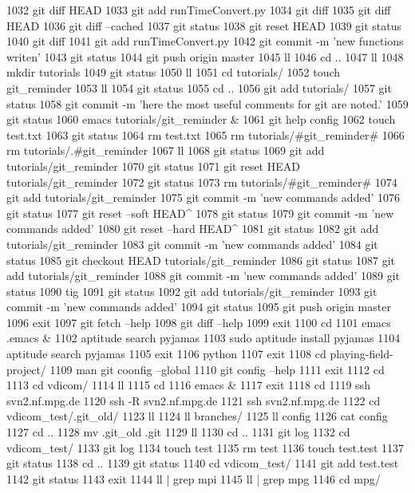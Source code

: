  1032  git diff HEAD
 1033  git add runTimeConvert.py
 1034  git diff
 1035  git diff HEAD
 1036  git diff --cached
 1037  git status
 1038  git reset HEAD
 1039  git status
 1040  git diff
 1041  git add runTimeConvert.py
 1042  git commit -m 'new functions writen'
 1043  git status
 1044  git push origin master
 1045  ll
 1046  cd ..
 1047  ll
 1048  mkdir tutorials
 1049  git status
 1050  ll
 1051  cd tutorials/
 1052  touch git_reminder
 1053  ll
 1054  git status
 1055  cd ..
 1056  git add tutorials/
 1057  git status
 1058  git commit -m 'here the most useful comments for git are noted.'
 1059  git status
 1060  emacs tutorials/git_reminder &
 1061  git help config
 1062  touch test.txt
 1063  git status
 1064  rm test.txt 
 1065  rm tutorials/#git_reminder# 
 1066  rm tutorials/.#git_reminder 
 1067  ll
 1068  git status
 1069  git add tutorials/git_reminder
 1070  git status
 1071  git reset HEAD tutorials/git_reminder
 1072  git status
 1073  rm tutorials/#git_reminder# 
 1074  git add tutorials/git_reminder
 1075  git commit -m 'new commands added'
 1076  git status
 1077  git reset --soft HEAD^
 1078  git status
 1079  git commit -m 'new commands added'
 1080  git reset --hard HEAD^
 1081  git status
 1082  git add tutorials/git_reminder
 1083  git commit -m 'new commands added'
 1084  git status
 1085  git checkout HEAD tutorials/git_reminder
 1086  git status
 1087  git add tutorials/git_reminder
 1088  git commit -m 'new commands added'
 1089  git status
 1090  tig
 1091  git status
 1092  git add tutorials/git_reminder
 1093  git commit -m 'new commands added'
 1094  git status
 1095  git push origin master
 1096  exit
 1097  git fetch --help
 1098  git diff --help
 1099  exit
 1100  cd
 1101  emacs .emacs &
 1102  aptitude search pyjamas
 1103  sudo aptitude install pyjamas
 1104  aptitude search pyjamas
 1105  exit
 1106  python
 1107  exit
 1108  cd playing-field-project/
 1109  man git coonfig --global 
 1110  git config --help
 1111  exit
 1112  cd
 1113  cd vdicom/
 1114  ll
 1115  cd
 1116  emacs &
 1117  exit
 1118  cd
 1119  ssh svn2.nf.mpg.de
 1120  ssh -R svn2.nf.mpg.de
 1121  ssh svn2.nf.mpg.de
 1122  cd vdicom_test/.git_old/
 1123  ll
 1124  ll branches/
 1125  ll config 
 1126  cat config 
 1127  cd ..
 1128  mv .git_old .git
 1129  ll
 1130  cd ..
 1131  git log
 1132  cd vdicom_test/
 1133  git log
 1134  touch test
 1135  rm test 
 1136  touch test.test
 1137  git status
 1138  cd ..
 1139  git status
 1140  cd vdicom_test/
 1141  git add test.test
 1142  git status
 1143  exit
 1144  ll | grep mpi
 1145  ll | grep mpg
 1146  cd mpg/

